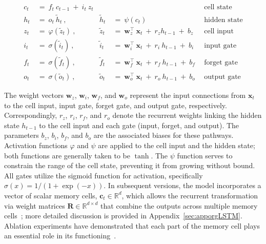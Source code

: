 \begin{align}
c_t \ &= \  f_t \ c_{t-1} \ + \ i_t \ z_t &  & &\text{cell state} \\
h_t  \ &= \ o_t \ \tilde{h}_t \ , & \tilde{h}_t \ &= \ \psi \left( c_t\right)
  &\text{hidden state} \\
z_t \ &= \ \varphi \left( \tilde{z}_t \right) \ , 
  &\tilde{z}_t \ &=  \ \mathbf{w}^\top_{z} \ \mathbf{x}_t \ + \
  r_{z}  h_{t-1} \ + \  b_{z} \ \
  &\text{cell input} \\
i_t \ &= \ \sigma \left( \tilde{i}_t  \right) \ , 
  &\tilde{i}_t \ &= \ \mathbf{w}^\top_{i} \ \mathbf{x}_t \ + \
  r_{i}  \ h_{t-1} \ + \  b_{i} \ \
  &\text{input gate} \\
f_t \ &= \ \sigma \left(  \tilde{f}_t \right) \ , 
  &\tilde{f}_t \ &= \ \mathbf{w}^\top_{f} \ \mathbf{x}_t  \ + \
  r_{f}  \ h_{t-1} \ + \  b_{f} \ \
  &\text{forget gate} \\
o_t \ &= \ \sigma \left( \tilde{o}_t \right) \ , 
  &\tilde{o}_t  \ &= \ \mathbf{w}^\top_{o} \ \mathbf{x}_t \ + \
  r_{o}  \ h_{t-1} \ + \  b_{o} \ \
  &\text{output gate} 
\end{align}

The weight vectors $\mathbf{w}_{z}$, $\mathbf{w}_{i}$, $\mathbf{w}_{f}$, and $\mathbf{w}_{o}$ represent the input connections from $\mathbf{x}_t$ to the cell input, input gate, forget gate, and output gate, respectively. Correspondingly, $r_{z}$, $r_{i}$, $r_{f}$, and $r_{o}$ denote the recurrent weights linking the hidden state $h_{t-1}$ to the cell input and each gate (input, forget, and output). The parameters $b_{z}$, $b_{i}$, $b_{f}$, and $b_{o}$ are the associated biases for these pathways. Activation functions $\varphi$ and $\psi$ are applied to the cell input and the hidden state; both functions are generally taken to be $\tanh$. The $\psi$ function serves to constrain the range of the cell state, preventing it from growing without bound. All gates utilize the sigmoid function for activation, specifically $\sigma(x) = 1/(1+\exp(-x))$. In subsequent versions, the model incorporates a vector of scalar memory cells, $\mathbf{c}_t \in \mathbb{R}^d$, which allows the recurrent transformation via weight matrices $\mathbf{R} \in \mathbb{R}^{d \times d}$ that combine the outputs across multiple memory cells~\citep{Greff:15}; more detailed discussion is provided in Appendix~\ref{sec:apporgLSTM}. Ablation experiments have demonstrated that each part of the memory cell plays an essential role in its functioning~\citep{Greff:15}.

